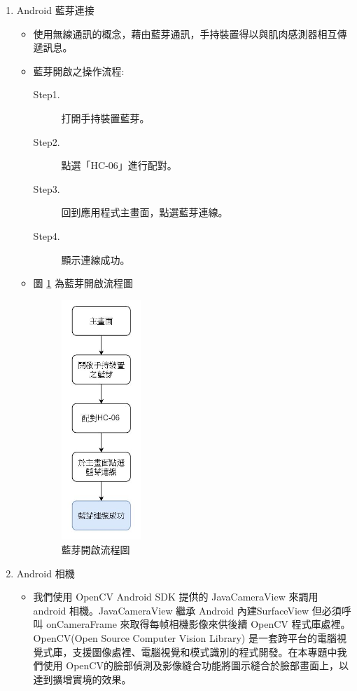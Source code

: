 \documentclass[12pt]{article}  %
\theoremstyle{plain}
\begin{document}
\begin{enumerate}
\item Android 藍芽連接
\begin{itemize}
\item 使用無線通訊的概念，藉由藍芽通訊，手持裝置得以與肌肉感測器相互傳遞訊息。
\item 藍芽開啟之操作流程:
\begin{description}
\item [Step1.] 打開手持裝置藍芽。
\item [Step2.] 點選「HC-06」進行配對。
\item [Step3.] 回到應用程式主畫面，點選藍芽連線。
\item [Step4.] 顯示連線成功。
\end{description}
\item 圖 \ref{藍芽開啟流程圖} 為藍芽開啟流程圖
\begin{figure}[h]  %
\centering
\includegraphics[width=3cm]{pic/ch2/藍芽開啟流程圖.JPG}
\caption{藍芽開啟流程圖} \label{藍芽開啟流程圖}
\end{figure}
\end{itemize}

\item Android 相機
\begin{itemize}
\item 我們使用 OpenCV Android SDK 提供的 JavaCameraView 來調用 android 相機。JavaCameraView 繼承 Android 內建SurfaceView 但必須呼叫 onCameraFrame 來取得每帧相機影像來供後續 OpenCV 程式庫處裡。OpenCV(Open Source Computer Vision Library) 是一套跨平台的電腦視覺式庫，支援圖像處裡、電腦視覺和模式識別的程式開發。在本專題中我們使用 OpenCV的臉部偵測及影像縫合功能將圖示縫合於臉部畫面上，以達到擴增實境的效果。
\end{itemize}
\end{enumerate}
\end{document}
